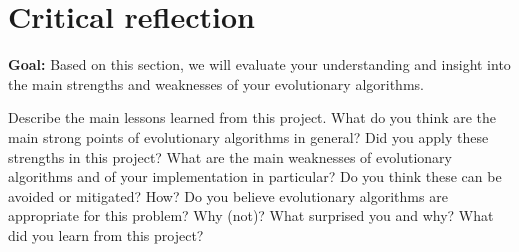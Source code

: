 \documentclass[a4paper,10pt]{article}
\newcommand{\ReplaceMe}[1]{{\color{blue}#1}}
\newcommand{\RemoveMe}[1]{{\color{purple}#1}}
\begin{document}
\section{Critical reflection}

\RemoveMe{\textbf{Goal:} Based on this section, we will evaluate your understanding and insight into the main strengths and weaknesses of your evolutionary algorithms.}

\ReplaceMe{Describe the main lessons learned from this project. What do you think are the main strong points of evolutionary algorithms in general? Did you apply these strengths in this project? What are the main weaknesses of evolutionary algorithms and of your implementation in particular? Do you think these can be avoided or mitigated? How? Do you believe evolutionary algorithms are appropriate for this problem? Why (not)? What surprised you and why? What did you learn from this project?}

%



\end{document}
